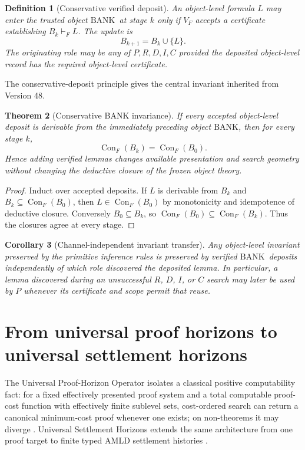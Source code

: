 \documentclass[11pt]{article}
\newtheorem{definition}{Definition}[section]
\newtheorem{theorem}[definition]{Theorem}
\newtheorem{corollary}[definition]{Corollary}
\theoremstyle{remark}
\newcommand{\BANK}{\ensuremath{\mathrm{BANK}}}
\newcommand{\Con}{\operatorname{Con}}
\begin{document}
\begin{definition}[Conservative verified deposit]
An object-level formula $L$ may enter the trusted object \BANK\ at stage $k$ only if $V_F$ accepts a certificate establishing $B_k\vdash_F L$. The update is
\[
B_{k+1}=B_k\cup\{L\}.
\]
The originating role may be any of $P,R,D,I,C$ provided the deposited object-level record has the required object-level certificate.
\end{definition}

The conservative-deposit principle gives the central invariant inherited from Version 48.

\begin{theorem}[Conservative BANK invariance]
If every accepted object-level deposit is derivable from the immediately preceding object \BANK, then for every stage $k$,
\[
\Con_F(B_k)=\Con_F(B_0).
\]
Hence adding verified lemmas changes available presentation and search geometry without changing the deductive closure of the frozen object theory.
\end{theorem}

\begin{proof}
Induct over accepted deposits. If $L$ is derivable from $B_k$ and $B_k\subseteq\Con_F(B_0)$, then $L\in\Con_F(B_0)$ by monotonicity and idempotence of deductive closure. Conversely $B_0\subseteq B_k$, so $\Con_F(B_0)\subseteq\Con_F(B_k)$. Thus the closures agree at every stage.
\end{proof}

\begin{corollary}[Channel-independent invariant transfer]
Any object-level invariant preserved by the primitive inference rules is preserved by verified \BANK\ deposits independently of which role discovered the deposited lemma. In particular, a lemma discovered during an unsuccessful $R$, $D$, $I$, or $C$ search may later be used by $P$ whenever its certificate and scope permit that reuse.
\end{corollary}

\section{From universal proof horizons to universal settlement horizons}

The Universal Proof-Horizon Operator isolates a classical positive computability fact: for a fixed effectively presented proof system and a total computable proof-cost function with effectively finite sublevel sets, cost-ordered search can return a canonical minimum-cost proof whenever one exists; on non-theorems it may diverge \cite{uph}. Universal Settlement Horizons extends the same architecture from one proof target to finite typed AMLD settlement histories \cite{ush}.
\end{document}
